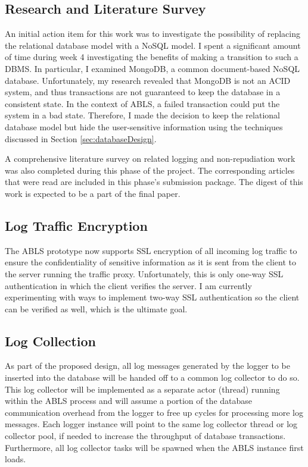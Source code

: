 \documentclass{sig-alternate}
\begin{document}
\subsection{Research and Literature Survey}
An initial action item for this work was to investigate the possibility of replacing the relational database model with a 
NoSQL model. I spent a significant amount of time during week 4 investigating the benefits of making a transition
to such a DBMS. In particular, I examined MongoDB, a common document-based NoSQL database. Unfortunately,
my research revealed that MongoDB is not an ACID system, and thus transactions are not guaranteed to keep the
database in a consistent state. In the context of ABLS, a failed transaction could put the system in a bad state. Therefore,
I made the decision to keep the relational database model but hide the user-sensitive information using the techniques
discussed in Section \ref{sec:databaseDesign}.

A comprehensive literature survey on related logging and non-repudiation work was also completed during this phase 
of the project. The corresponding articles that were read are included in this phase's submission package. The digest 
of this work is expected to be a part of the final paper.

\subsection{Log Traffic Encryption}
The ABLS prototype now supports SSL encryption of all incoming log traffic to ensure the confidentiality of sensitive
information as it is sent from the client to the server running the traffic proxy. Unfortunately, this is only one-way SSL 
authentication in which the client verifies the server. I am currently experimenting with ways to implement two-way 
SSL authentication so the client can be verified as well, which is the ultimate goal. 

\subsection{Log Collection}
As part of the proposed design, all log messages generated by the logger to be inserted into the 
database will be handed off to a common log collector to do so. This log collector will be implemented as a 
separate actor (thread) running within the ABLS process and will assume a portion of the database 
communication overhead from the logger to free up cycles for processing more log messages. Each logger instance
will point to the same log collector thread or log collector pool, if needed to increase the throughput of database 
transactions. Furthermore, all log collector tasks will be spawned when the ABLS instance first loads.
\end{document}
